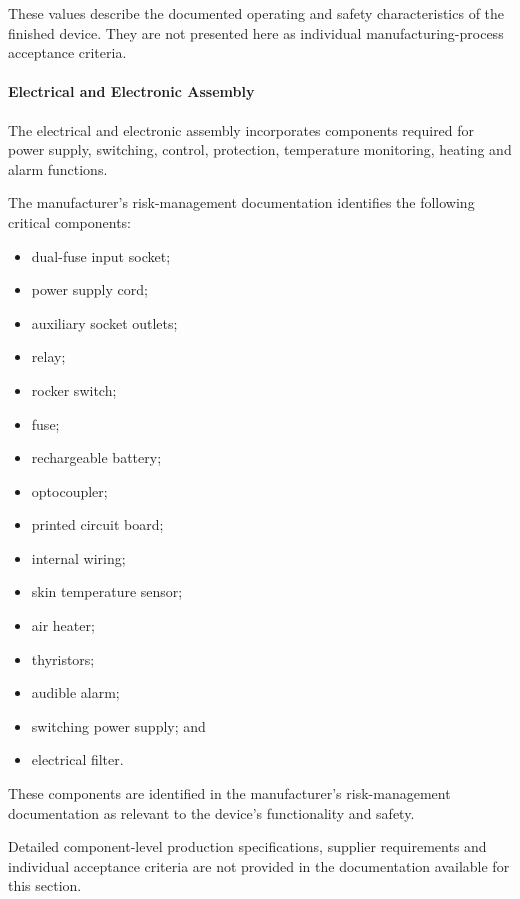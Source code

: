 These values describe the documented operating and safety
characteristics of the finished device. They are not presented
here as individual manufacturing-process acceptance criteria.


\paragraph{Electrical and Electronic Assembly}

The electrical and electronic assembly incorporates components
required for power supply, switching, control, protection,
temperature monitoring, heating and alarm functions.

The manufacturer's risk-management documentation identifies the
following critical components:

\begin{itemize}
    \item dual-fuse input socket;
    \item power supply cord;
    \item auxiliary socket outlets;
    \item relay;
    \item rocker switch;
    \item fuse;
    \item rechargeable battery;
    \item optocoupler;
    \item printed circuit board;
    \item internal wiring;
    \item skin temperature sensor;
    \item air heater;
    \item thyristors;
    \item audible alarm;
    \item switching power supply; and
    \item electrical filter.
\end{itemize}

These components are identified in the manufacturer's
risk-management documentation as relevant to the device's
functionality and safety.

Detailed component-level production specifications, supplier
requirements and individual acceptance criteria are not provided
in the documentation available for this section.

